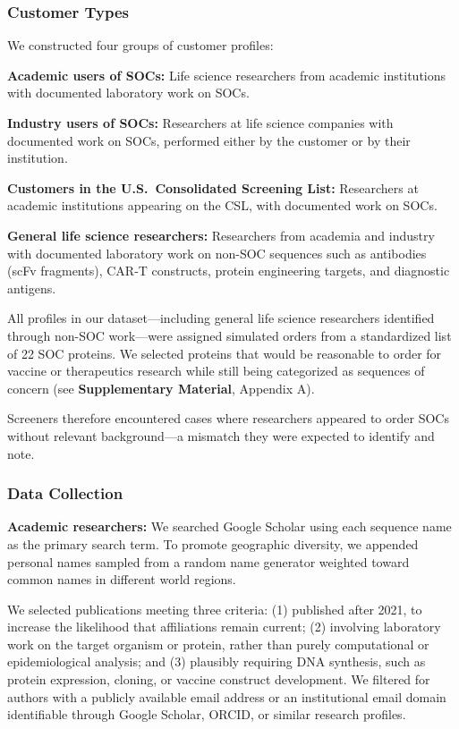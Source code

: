 \documentclass[utf8]{FrontiersinHarvard}
\begin{document}
\subsubsection{Customer Types}

We constructed four groups of customer profiles:

\textbf{Academic users of SOCs:} Life science researchers from academic institutions with documented laboratory work on SOCs.

\textbf{Industry users of SOCs:} Researchers at life science companies with documented work on SOCs, performed either by the customer or by their institution.

\textbf{Customers in the U.S.\ Consolidated Screening List:} Researchers at academic institutions appearing on the CSL, with documented work on SOCs.

\textbf{General life science researchers:} Researchers from academia and industry with documented laboratory work on non-SOC sequences such as antibodies (scFv fragments), CAR-T constructs, protein engineering targets, and diagnostic antigens.

All profiles in our dataset---including general life science researchers identified through non-SOC work---were assigned simulated orders from a standardized list of 22 SOC proteins. We selected proteins that would be reasonable to order for vaccine or therapeutics research while still being categorized as sequences of concern (see \textbf{Supplementary Material}, Appendix A).

Screeners therefore encountered cases where researchers appeared to order SOCs without relevant background---a mismatch they were expected to identify and note.

\subsubsection{Data Collection}

\textbf{Academic researchers:} We searched Google Scholar using each sequence name as the primary search term. To promote geographic diversity, we appended personal names sampled from a random name generator weighted toward common names in different world regions.

We selected publications meeting three criteria: (1) published after 2021, to increase the likelihood that affiliations remain current; (2) involving laboratory work on the target organism or protein, rather than purely computational or epidemiological analysis; and (3) plausibly requiring DNA synthesis, such as protein expression, cloning, or vaccine construct development. We filtered for authors with a publicly available email address or an institutional email domain identifiable through Google Scholar, ORCID, or similar research profiles.
\end{document}
